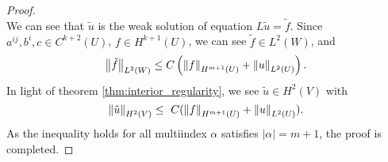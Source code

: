 \begin{proof}
\begin{equation}
    \end{equation}
    We can see that $\tilde{u}$ is the weak solution of equation $L\tilde{u}=\tilde{f}$. Since $a^{ij},b^{i},c\in C^{k+2}(U)$, $f\in H^{k+1}(U)$, we can see $\tilde{f}\in L^{2}(W)$, and 
    \begin{equation}
        \left\|\tilde{f}\right\|_{L^{2}(W)}\le C\left(\left\|f\right\|_{H^{m+1}(U)}+\left\|u\right\|_{L^{2}(U)}\right).
    \end{equation}
    In light of theorem \ref{thm:interior_regularity}, we see $\tilde{u}\in H^{2}(V)$ with 
    \begin{equation}
        \norm{\tilde{u}}_{H^{2}(V)}\le\ C(\norm{f}_{H^{m+1}(U)}+\norm{u}_{L^{2}(U)}).
    \end{equation}
    As the inequality holds for all multiindex $\alpha$ satisfies $|\alpha|=m+1$, the proof is completed.
\end{proof}
